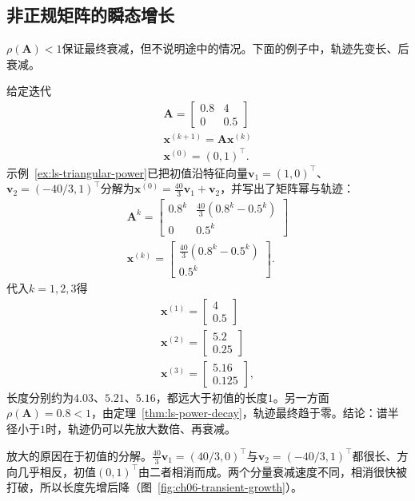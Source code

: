 \subsection{非正规矩阵的瞬态增长}

$\rho(\bm A)<1$保证最终衰减，但不说明途中的情况。下面的例子中，轨迹先变长、后衰减。
\begin{example}[非正规矩阵的瞬态放大]
\label{ex:ls-transient-growth}
给定迭代
\begin{equation}
\begin{gathered}
\bm A=\begin{bmatrix}0.8&4\\0&0.5\end{bmatrix}\\
\bm x^{(k+1)}=\bm A\bm x^{(k)}\\
\bm x^{(0)}=(0,1)^{\top}.
\end{gathered}
\label{eq:ch06-fixed-iteration-example}
\end{equation}
示例~\ref{ex:ls-triangular-power}已把初值沿特征向量$\bm v_1=(1,0)^{\top}$、$\bm v_2=(-40/3,1)^{\top}$分解为$\bm x^{(0)}=\tfrac{40}{3}\bm v_1+\bm v_2$，并写出了矩阵幂与轨迹：
\begin{equation}
\begin{gathered}
\bm A^k=
 \begin{bmatrix}
  0.8^k&\frac{40}{3}(0.8^k-0.5^k)\\
  0&0.5^k
 \end{bmatrix}\\
\bm x^{(k)}=
 \begin{bmatrix}\frac{40}{3}(0.8^k-0.5^k)\\0.5^k\end{bmatrix}.
\end{gathered}
\label{eq:ch06-diagonalizable-finite-trajectory}
\end{equation}
代入$k=1,2,3$得
\[
\begin{gathered}
\bm x^{(1)}=\begin{bmatrix}4\\0.5\end{bmatrix}\\
\bm x^{(2)}=\begin{bmatrix}5.2\\0.25\end{bmatrix}\\
\bm x^{(3)}=\begin{bmatrix}5.16\\0.125\end{bmatrix},
\end{gathered}
\]
长度分别约为$4.03$、$5.21$、$5.16$，都远大于初值的长度$1$。另一方面$\rho(\bm A)=0.8<1$，由定理~\ref{thm:ls-power-decay}，轨迹最终趋于零。结论：谱半径小于$1$时，轨迹仍可以先放大数倍、再衰减。
\end{example}
放大的原因在于初值的分解。$\tfrac{40}{3}\bm v_1=(40/3,0)^\top$与$\bm v_2=(-40/3,1)^\top$都很长、方向几乎相反，初值$(0,1)^\top$由二者相消而成。两个分量衰减速度不同，相消很快被打破，所以长度先增后降（图~\ref{fig:ch06-transient-growth}）。

